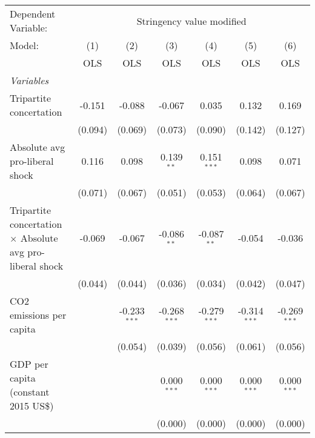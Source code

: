 
\begingroup
\centering
\begin{tabular}{lcccccc}
   \toprule
   Dependent Variable: & \multicolumn{6}{c}{Stringency value modified}\\
   Model:                                                           & (1)     & (2)            & (3)            & (4)            & (5)            & (6)\\  
                                                                    &  OLS    & OLS            & OLS            & OLS            & OLS            & OLS\\  
   \midrule
   \emph{Variables}\\
   Tripartite concertation                                          & -0.151  & -0.088         & -0.067         & 0.035          & 0.132          & 0.169\\   
                                                                    & (0.094) & (0.069)        & (0.073)        & (0.090)        & (0.142)        & (0.127)\\   
   Absolute avg pro-liberal shock                                   & 0.116   & 0.098          & 0.139$^{**}$   & 0.151$^{***}$  & 0.098          & 0.071\\   
                                                                    & (0.071) & (0.067)        & (0.051)        & (0.053)        & (0.064)        & (0.067)\\   
   Tripartite concertation $\times$ Absolute avg pro-liberal shock  & -0.069  & -0.067         & -0.086$^{**}$  & -0.087$^{**}$  & -0.054         & -0.036\\   
                                                                    & (0.044) & (0.044)        & (0.036)        & (0.034)        & (0.042)        & (0.047)\\   
   CO2 emissions per capita                                         &         & -0.233$^{***}$ & -0.268$^{***}$ & -0.279$^{***}$ & -0.314$^{***}$ & -0.269$^{***}$\\   
                                                                    &         & (0.054)        & (0.039)        & (0.056)        & (0.061)        & (0.056)\\   
   GDP per capita (constant 2015 US\$)                              &         &                & 0.000$^{***}$  & 0.000$^{***}$  & 0.000$^{***}$  & 0.000$^{***}$\\   
                                                                    &         &                & (0.000)        & (0.000)        & (0.000)        & (0.000)\\   

\end{tabular}
